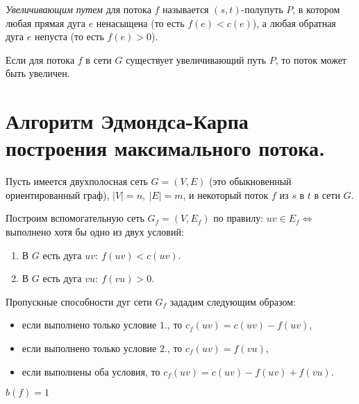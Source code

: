 \begin{definition}
    \emph{Увеличивающим путем} для потока $ f $ называется $ (s,t) $-полупуть $ P $, в котором любая прямая дуга $ e $ ненасыщена (то есть $ f(e) < c(e) $), а любая обратная дуга $ e $ непуста (то есть $ f(e) > 0 $).
\end{definition}

\begin{lemma}
    Если для потока $ f $ в сети $ G $ существует увеличивающий путь $ P $, то поток может быть увеличен.
\end{lemma}

\section{Алгоритм Эдмондса-Карпа построения максимального потока.}

\begin{note}
    Пусть имеется двухполосная сеть $ G = (V,E) $ (это обыкновенный ориентированный граф), $ | V | = n, \ | E | = m $, и некоторый поток $ f $ из $ s $ в $ t $ в сети $ G $.

    Построим вспомогательную сеть $ G_f = (V,E_f) $ по правилу: $ uv \in E_f \iff $ выполнено хотя бы одно из двух условий:
    \begin{enumerate}
        \item В $ G $ есть дуга $ uv: \ f(uv) < c(uv) $.
        \item В $ G $ есть дуга $ vu: \ f(vu) > 0 $.
    \end{enumerate}

    Пропускные способности дуг сети $ G_f $ зададим следующим образом:
    \begin{itemize}
        \item если выполнено только условие $ 1. $, то $ c_f(uv) = c(uv) - f(uv) $,
        \item если выполнено только условие $ 2. $, то $ c_f(uv) = f(vu) $,
        \item если выполнены оба условия, то $ c_f(uv) = c(uv) - f(uv) + f(vu) $.
    \end{itemize}
\end{note}

\begin{example}
    $ b(f) = 1$
    \begin{figure}[H]
        \centering
        \label{fig:fig_32}
    \end{figure}
\end{example}